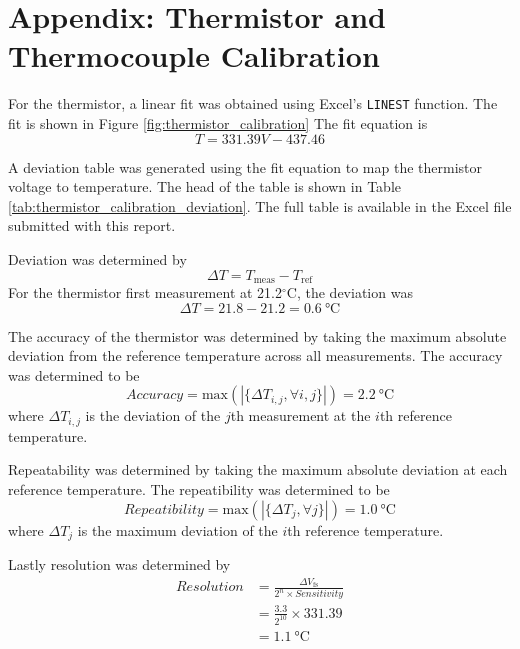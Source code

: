 \section{Appendix: Thermistor and Thermocouple Calibration}

\noindent For the thermistor, a linear fit was obtained using Excel's \texttt{LINEST} function. The fit is shown in Figure \ref{fig:thermistor_calibration}
The fit equation is 
\begin{equation}
    T = 331.39 V  -437.46 \label{eq:thermistor_calibration}
\end{equation}

A deviation table was generated using the fit equation to map the thermistor voltage to temperature. The head of the table is shown in 
Table \ref{tab:thermistor_calibration_deviation}. The full table is available in the Excel file submitted with this report.

Deviation was determined by 
\begin{equation}
    \Delta T  = T_{\text{meas}} - T_{\text{ref}} \nonumber
\end{equation}
For the thermistor first measurement at 21.2$^\circ$C, the deviation was
\begin{equation}
    \Delta T = 21.8 - 21.2 = \qty{0.6}{\celsius} \nonumber
\end{equation}

The accuracy of the thermistor was determined by taking the maximum absolute deviation from the reference temperature across all measurements. The 
accuracy was determined to be
\begin{equation}
    Accuracy = \text{max}(|\{\Delta T_{i, j}, \forall i, j\}|) = \qty{2.2}{\celsius} \nonumber
\end{equation}
where $\Delta T_{i, j}$ is the deviation of the $j$th measurement at the $i$th reference temperature.

Repeatability was determined by taking the maximum absolute deviation at each reference temperature. The repeatibility was determined to be
\begin{equation}
    Repeatibility = \text{max}(|\{\Delta T_{j}, \forall j\}|) = \qty{1.0}{\celsius} \nonumber
\end{equation}
where $\Delta T_{j}$ is the maximum deviation of the $i$th reference temperature.

Lastly resolution was determined by
\begin{align*}
    Resolution &= \frac{\Delta V_{\text{fs}}}{2^n \times Sensitivity} \\
               &= \frac{3.3}{2^{10}} \times 331.39 \\
               &= \qty{1.1}{\celsius}
\end{align*}

